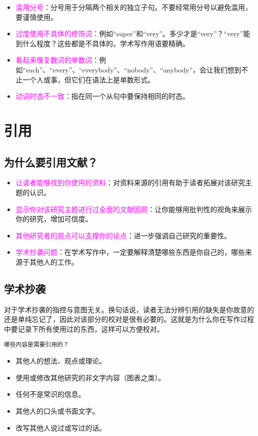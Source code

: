 \documentclass[cn,hazy,blue,14pt,screen]{elegantnote} %
\begin{document}
\begin{itemize}
  \item \textcolor{magenta}{滥用分号}：分号用于分隔两个相关的独立子句。不要经常用分号以避免滥用，要谨慎使用。
  \item \textcolor{magenta}{过度使用不具体的修饰词}：例如“super”和“very”。多少才是“very”？“very”能到什么程度？这些都是不具体的。学术写作用语要精确。
  \item \textcolor{magenta}{看起来像复数词的单数词}：例如“each”、“every”、“everybody”、“nobody”、“anybody”，会让我们想到不止一个人或事，但它们在语法上是单数形式。
  \item \textcolor{magenta}{动词时态不一致}：指在同一个从句中要保持相同的时态。
\end{itemize}

\newpage

\section{引用}

\subsection{为什么要引用文献？}

\begin{itemize}
  \item \textcolor{magenta}{让读者能够找到你使用的资料}：对资料来源的引用有助于读者拓展对该研究主题的认识。
  \item \textcolor{magenta}{显示你对该研究主题进行过全面的文献回顾}：让你能够用批判性的视角来展示你的研究，增加可信度。
  \item \textcolor{magenta}{其他研究者的观点可以支撑你的论点}：进一步强调自己研究的重要性。
  \item \textcolor{magenta}{学术抄袭问题}：在学术写作中，一定要解释清楚哪些东西是你自己的，哪些来源于其他人的工作。
\end{itemize}

\subsection{学术抄袭}

对于学术抄袭的指控与意图无关。换句话说，读者无法分辨引用的缺失是你故意的还是单纯忘记了，因此对该部分的校对是很有必要的。这就是为什么你在写作过程中要记录下所有使用过的东西，这样可以方便校对。

\lstinline{哪些内容是需要引用的？}

\begin{itemize}
  \item 其他人的想法、观点或理论。
  \item 使用或修改其他研究的非文字内容（图表之类）。
  \item 任何不是常识的信息。
  \item 其他人的口头或书面文字。
  \item 改写其他人说过或写过的话。
\end{itemize}
\end{document}
